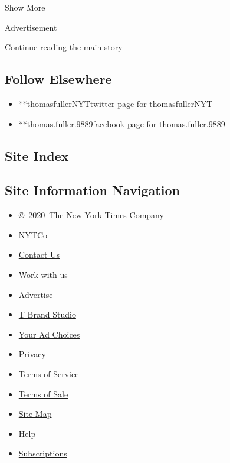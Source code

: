 Show More

Advertisement

\protect\hyperlink{after-mid2}{Continue reading the main story}

\hypertarget{follow-elsewhere}{%
\subsection{Follow Elsewhere}\label{follow-elsewhere}}

\begin{itemize}
\tightlist
\item
  \href{https://twitter.com/thomasfullerNYT}{**thomasfullerNYTtwitter
  page for thomasfullerNYT}
\item
  \href{https://www.facebook.com/thomas.fuller.9889}{**thomas.fuller.9889facebook
  page for thomas.fuller.9889}
\end{itemize}

\hypertarget{site-index}{%
\subsection{Site Index}\label{site-index}}

\hypertarget{site-information-navigation}{%
\subsection{Site Information
Navigation}\label{site-information-navigation}}

\begin{itemize}
\tightlist
\item
  \href{https://help.nytimes.com/hc/en-us/articles/115014792127-Copyright-notice}{©~2020~The
  New York Times Company}
\end{itemize}

\begin{itemize}
\tightlist
\item
  \href{https://www.nytco.com/}{NYTCo}
\item
  \href{https://help.nytimes.com/hc/en-us/articles/115015385887-Contact-Us}{Contact
  Us}
\item
  \href{https://www.nytco.com/careers/}{Work with us}
\item
  \href{https://nytmediakit.com/}{Advertise}
\item
  \href{http://www.tbrandstudio.com/}{T Brand Studio}
\item
  \href{https://www.nytimes.com/privacy/cookie-policy\#how-do-i-manage-trackers}{Your
  Ad Choices}
\item
  \href{https://www.nytimes.com/privacy}{Privacy}
\item
  \href{https://help.nytimes.com/hc/en-us/articles/115014893428-Terms-of-service}{Terms
  of Service}
\item
  \href{https://help.nytimes.com/hc/en-us/articles/115014893968-Terms-of-sale}{Terms
  of Sale}
\item
  \href{https://spiderbites.nytimes.com}{Site Map}
\item
  \href{https://help.nytimes.com/hc/en-us}{Help}
\item
  \href{https://www.nytimes.com/subscription?campaignId=37WXW}{Subscriptions}
\end{itemize}

